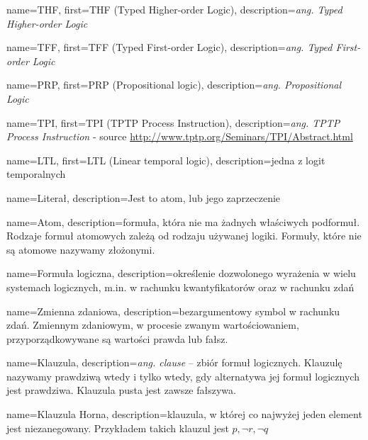  {
    name=THF,
    first={THF (Typed Higher-order Logic)},
    description={\textit{ang. Typed Higher-order Logic}}
}

 {
    name=TFF,
    first={TFF (Typed First-order Logic)},
    description={\textit{ang. Typed First-order Logic}}
}

 {
    name={PRP},
    first={PRP (Propositional logic)},
    description={\textit{ang. Propositional Logic}}
}

 {
    name=TPI,
    first={TPI (TPTP Process Instruction)},
    description={\textit{ang. TPTP Process Instruction} - source \url{http://www.tptp.org/Seminars/TPI/Abstract.html}}
}

 {
    name=LTL,
    first={LTL (Linear temporal logic)},
    description={jedna z logit temporalnych}
}

 {
    name=Literał,
    description={Jest to atom, lub jego zaprzeczenie}
}

 {
    name=Atom,
    description={formuła, która nie ma żadnych właściwych podformuł. Rodzaje formuł atomowych zależą od rodzaju używanej logiki.
    Formuły, które nie są atomowe nazywamy złożonymi. }
}

 {
    name={Formuła logiczna},
    description={określenie dozwolonego wyrażenia w wielu systemach logicznych, m.in. w rachunku kwantyfikatorów oraz w rachunku zdań}
}

 {
    name=Zmienna zdaniowa,
    description={bezargumentowy symbol w rachunku zdań. Zmiennym zdaniowym, w procesie zwanym wartościowaniem, przyporządkowywane są wartości prawda lub fałsz.}
}

 {
    name=Klauzula,
    description={\textit{ang. clause} – zbiór formuł logicznych. Klauzulę nazywamy prawdziwą wtedy i tylko wtedy, gdy alternatywa jej formuł logicznych jest prawdziwa. Klauzula pusta jest zawsze fałszywa. }
}

 {
    name=Klauzula Horna,
    description={klauzula, w której co najwyżej jeden element jest niezanegowany. Przykładem takich klauzul jest ${p,\neg r,\neg q}$ }
}

